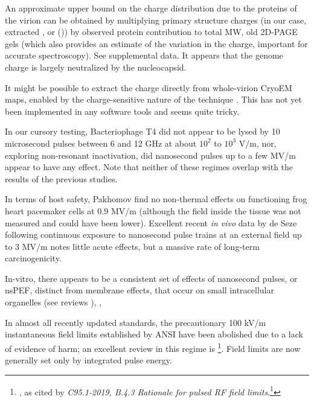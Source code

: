 \documentclass[paper.tex]{subfiles}
\begin{document}
\begin{multicols}{1}
An approximate upper bound on the charge distribution due to the proteins of the virion can be obtained by multiplying primary structure charges (in our case, extracted \cite{CIDER2017}, or (\cite{complete2003})) by observed protein contribution to total MW\cite{Quantitative1981}, old 2D-PAGE gels \cite{Influenza1978}\cite{Structurea} (which also provides an estimate of the variation in the charge, important for accurate spectroscopy). See supplemental data. It appears that the genome charge is largely neutralized by the nucleocapsid.

It might be possible to extract the charge directly from whole-virion CryoEM maps, enabled by the charge-sensitive nature of the technique \cite{Identification2018}\cite{Electrostatic2020}. This has not yet been implemented in any software tools and seems quite tricky. 

In our cursory testing, Bacteriophage T4 did not appear to be lysed by 10 microsecond pulses between 6 and 12 GHz at about $10^2$ to $10^3$ V/m, nor, exploring non-resonant inactivation, did nanosecond pulses up to a few MV/m appear to have any effect. Note that neither of these regimes overlap with the results of the previous studies.

In terms of host safety, Pakhomov \cite{Comparative} find no non-thermal effects on functioning frog heart pacemaker cells at 0.9 MV/m (although the field inside the tissue was not measured and could have been lower). Excellent recent \textit{in vivo} data by de Seze following continuous exposure to nanosecond pulse trains at an external field up to 3 MV/m \cite{Repeated2020} notes little acute effects, but a massive rate of long-term carcinogenicity. 

In-vitro, there appears to be a consistent set of effects of nanosecond pulses, or nsPEF, distinct from membrane effects, that occur on small intracellular organelles (see reviews \cite{Penetration2016c} \cite{Effects2016} ), \cite{Bioeffects}, 

In almost all recently updated standards, the precautionary 100 kV/m instantaneous field limits established by ANSI have been abolished due to a lack of evidence of harm; an excellent review in this regime is \footnote{\cite{treatyelectromagnetic}, as cited by \textit{C95.1-2019, B.4.3 Rationale for pulsed RF field limits}.\footnote{That same review also contains the following, which highlights the incredible difficulty of obtaining reliable results in this field: "Dr. de Seze also described an experiment in which two sham groups were mistakenly run and a significant difference was found. Dr. Klauenberg noted another series of experiments he reviewed where experimental treatment groups did not vary while the sham groups compared to each other did resulting in a significant difference that was otherwise meaningless."}}. Field limits are now generally set only by integrated pulse energy.


\end{multicols}
\end{document}
